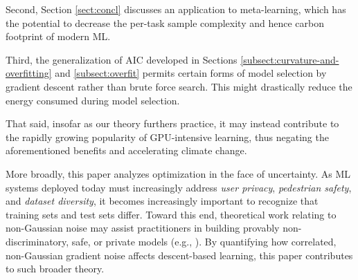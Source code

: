 \documentclass{article}
\theoremstyle{plain}
\theoremstyle{definition}
\begin{document}
    Second, Section \ref{sect:concl} discusses an application to meta-learning,
    which has the potential to decrease the per-task sample complexity and
    hence carbon footprint of modern ML.
     
    Third, the generalization of AIC developed in  Sections
    \ref{subsect:curvature-and-overfitting} and \ref{subsect:overfit} permits
    certain forms of model selection by gradient descent rather than brute
    force search.  This might drastically reduce the energy consumed during
    model selection.

    That said, insofar as our theory furthers practice, it may instead
    contribute to the rapidly growing popularity of GPU-intensive learning,
    thus negating the aforementioned benefits and accelerating climate change.

    More broadly, this paper analyzes optimization in the face of uncertainty.
    As ML systems deployed today must increasingly address \emph{user privacy},
    \emph{pedestrian safety}, and \emph{dataset diversity}, it becomes
    increasingly important to recognize that training sets and test sets
    differ.  Toward this end, theoretical work relating to non-Gaussian noise
    may assist practitioners in building provably non-discriminatory, safe, or
    private models (e.g., \cite{dw06}).  By quantifying how correlated,
    non-Gaussian gradient noise affects descent-based learning, this paper
    contributes to such broader theory.



\end{document}
